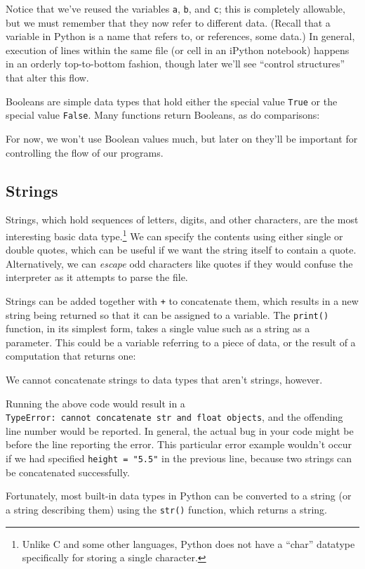 \documentclass[
]{memoir}
\begin{document}
Notice that we've reused the variables \texttt{a}, \texttt{b}, and \texttt{c}; this is completely allowable, but we must remember that they now refer to different data. (Recall that a variable in Python is a name that refers to, or references, some data.) In general, execution of lines within the same file (or cell in an iPython notebook) happens in an orderly top-to-bottom fashion, though later we'll see \enquote{control structures} that alter this flow.

Booleans are simple data types that hold either the special value \texttt{True} or the special value \texttt{False}. Many functions return Booleans, as do comparisons:

For now, we won't use Boolean values much, but later on they'll be important for controlling the flow of our programs.

\hypertarget{strings}{%
\subsection*{Strings}\label{strings}}

Strings, which hold sequences of letters, digits, and other characters, are the most interesting basic data type.\footnote{Unlike C and some other languages, Python does not have a \enquote{char} datatype specifically for storing a single character.} We can specify the contents using either single or double quotes, which can be useful if we want the string itself to contain a quote. Alternatively, we can \emph{escape} odd characters like quotes if they would confuse the interpreter as it attempts to parse the file.

Strings can be added together with \texttt{+} to concatenate them, which results in a new string being returned so that it can be assigned to a variable. The \texttt{print()} function, in its simplest form, takes a single value such as a string as a parameter. This could be a variable referring to a piece of data, or the result of a computation that returns one:

We cannot concatenate strings to data types that aren't strings, however.

Running the above code would result in a \texttt{TypeError:\ cannot\ concatenate\ \textquotesingle{}str\textquotesingle{}\ and\ \textquotesingle{}float\textquotesingle{}\ objects}, and the offending line number would be reported. In general, the actual bug in your code might be before the line reporting the error. This particular error example wouldn't occur if we had specified \texttt{height\ =\ "5.5"} in the previous line, because two strings can be concatenated successfully.

Fortunately, most built-in data types in Python can be converted to a string (or a string describing them) using the \texttt{str()} function, which returns a string.

  
\end{document}
